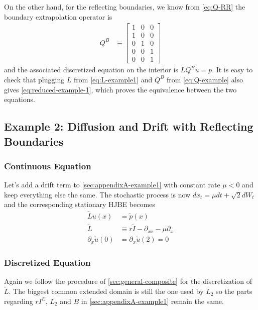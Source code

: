 \documentclass[11pt]{article}
\newcommand{\D}[1][]{\ensuremath{\partial_{#1}}}
\begin{document}
On the other hand, for the reflecting boundaries, we know from \cref{eq:Q-RR} the boundary extrapolation operator is
\begin{align}
	Q^B &\equiv \begin{bmatrix}
		1 & 0 & 0\\
		1 & 0 & 0\\
		0 & 1& 0\\
		0 & 0& 1\\
		0 & 0& 1
	\end{bmatrix}\label{eq:Q-example}
\end{align}
and the associated discretized equation on the interior is $LQ^Bu = p$. It is easy to check that plugging $L$ from \cref{eq:L-example1} and $Q^B$ from \cref{eq:Q-example} also gives \cref{eq:reduced-example-1}, which proves the equivalence between the two equations.

\subsection{Example 2: Diffusion and Drift with Reflecting Boundaries}\label{sec:appendixA-example2}
\subsubsection{Continuous Equation}
Let's add a drift term to \ref{sec:appendixA-example1} with constant rate $\mu < 0$ and keep everything else the same. The stochastic process is now $d x_t = \mu d t + \sqrt{2} d W_t$ and the corresponding stationary HJBE becomes
\begin{align}
	\tilde{L} u(x) &= \tilde{p}(x)\\
	\tilde{L} &\equiv r\tilde{I} - \D[xx] - \mu \D[x]\\
	\D[x]\tilde{u}(0) &= \D[x]\tilde{u}(2) = 0
\end{align}

\subsubsection{Discretized Equation}
Again we follow the procedure of \ref{sec:general-composite} for the discretization of $\tilde{L}$. The biggest common extended domain is still the one used by $L_2$ so the parts regarding $rI^E$, $L_2$ and $B$ in \ref{sec:appendixA-example1} remain the same.
\end{document}
